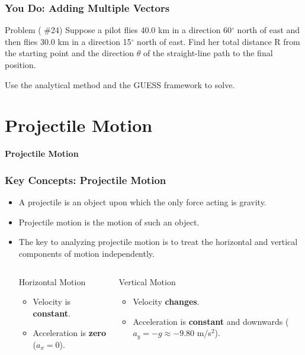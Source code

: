 \documentclass{beamer}
\begin{document}
\begin{frame}
\frametitle{You Do: Adding Multiple Vectors}
\begin{block}{Problem ( \#24)}
Suppose a pilot flies 40.0 km in a direction 60$^\circ$ north of east and then flies 30.0 km in a direction 15$^\circ$ north of east. Find her total distance R from the starting point and the direction $\theta$ of the straight-line path to the final position.
\end{block}
\begin{center}
\alert{Use the analytical method and the GUESS framework to solve.}
\end{center}
\end{frame}

\section{Projectile Motion}

\begin{frame}
\begin{center}
{\Huge \textbf{Projectile Motion}}
\end{center}
\end{frame}

\begin{frame}
\frametitle{Key Concepts: Projectile Motion}
\begin{itemize}
    \item A \alert{projectile} is an object upon which the only force acting is gravity.
    \pause
    \item \alert{Projectile motion} is the motion of such an object.
    \pause
    \item The key to analyzing projectile motion is to treat the horizontal and vertical components of motion \alert{independently}.
    \pause
    \begin{columns}
    \begin{block}{Horizontal Motion}
        \begin{itemize}
            \item Velocity is \textbf{constant}.
            \item Acceleration is \textbf{zero} ($a_x = 0$).
        \end{itemize}
    \end{block}
    \begin{block}{Vertical Motion}
        \begin{itemize}
            \item Velocity \textbf{changes}.
            \item Acceleration is \textbf{constant} and downwards ($a_y = -g \approx -9.80$ m/s$^2$).
        \end{itemize}
    \end{block}
    \end{columns}
\end{itemize}
\end{frame}
\end{document}
